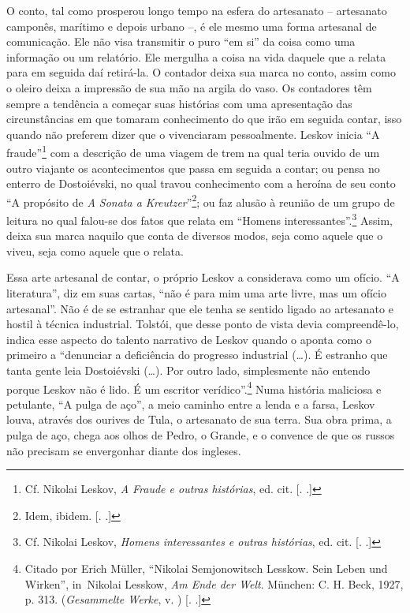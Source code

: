 O conto, tal como prosperou longo tempo na esfera do artesanato --
artesanato camponês, marítimo e depois urbano --, é ele mesmo uma forma
artesanal de comunicação. Ele não visa transmitir o puro ``em si'' da
coisa como uma informação ou um relatório. Ele mergulha a coisa na vida
daquele que a relata para em seguida daí retirá-la. O contador deixa sua
marca no conto, assim como o oleiro deixa a impressão de sua mão na
argila do vaso. \label{supra}Os contadores têm sempre a tendência a começar suas
histórias com uma apresentação das circunstâncias em que tomaram
conhecimento do que irão em seguida contar, isso quando não preferem
dizer que o vivenciaram pessoalmente. Leskov inicia ``A
fraude''\footnote{Cf. Nikolai Leskov, \emph{A Fraude e outras
  histórias}, ed. cit. [. .]} com a descrição de uma viagem de
trem na qual teria ouvido de um outro viajante os acontecimentos que
passa em seguida a contar; ou pensa no enterro de Dostoiévski, no qual
travou conhecimento com a heroína de seu conto ``A propósito de \emph{A
Sonata a Kreutzer}''\footnote{Idem, ibidem. [. .]}; ou faz
alusão à reunião de um grupo de leitura no qual falou-se dos fatos que
relata em ``Homens interessantes''.\footnote{Cf. Nikolai Leskov,
  \emph{Homens interessantes e outras histórias}, ed. cit. [. 
  .]} Assim, deixa sua marca naquilo que conta de diversos modos,
seja como aquele que o viveu, seja como aquele que o relata.

Essa arte artesanal de contar, o próprio Leskov a considerava como um
ofício. ``A literatura'', diz em suas cartas, ``não é para mim uma arte
livre, mas um ofício artesanal''. Não é de se estranhar que ele tenha se
sentido ligado ao artesanato e hostil à técnica industrial. Tolstói, que
desse ponto de vista devia compreendê-lo, indica esse aspecto do talento
narrativo de Leskov quando o aponta como o primeiro a ``denunciar a
deficiência do progresso industrial (\ldots{}). É estranho que tanta gente
leia Dostoiévski (\ldots{}). Por outro lado, simplesmente não entendo porque
Leskov não é lido. É um escritor verídico''.\footnote{Citado por Erich
  Müller, ``Nikolai Semjonowitsch Lesskow. Sein Leben und Wirken'',
  in~Nikolai Lesskow, \emph{Am Ende der Welt}. München: C. H. Beck, 1927,
  p. 313. (\emph{Gesammelte Werke}, v. ) [. .]} Numa
história maliciosa e petulante, ``A pulga de aço'', a meio caminho entre
a lenda e a farsa, Leskov louva, através dos ourives de Tula, o
artesanato de sua terra. Sua obra prima, a pulga de aço, chega aos olhos
de Pedro, o Grande, e o convence de que os russos não precisam se
envergonhar diante dos ingleses.

